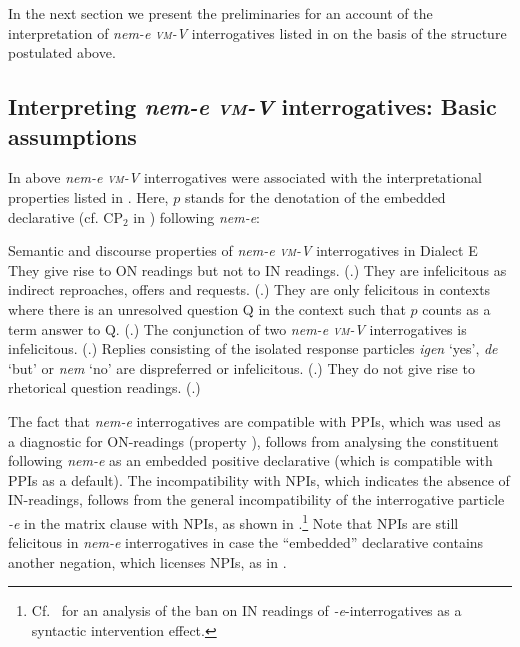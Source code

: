 \documentclass[output=paper,colorlinks,citecolor=brown]{langscibook}
\begin{document}
	In the next section we present the preliminaries for an account of the interpretation of  \textit{nem-e \textsc{vm}-V} interrogatives listed in  on the basis of the structure postulated above.
	
	
	
\subsection{Interpreting  \textit{nem-e \textsc{vm}-V} interrogatives: Basic assumptions}\label{sect:basic}
\largerpage
	In   above \textit{nem-e \textsc{vm}-V} interrogatives were  associated with  the interpretational  properties listed in .  Here, $p$ stands for the denotation of the embedded declarative (cf. CP$_2$ in ) following \textit{nem-e}:

	
	\ea\label{properties} Semantic and discourse properties of \textit{nem-e \textsc{vm}-V} interrogatives in Dialect E
	\ea\label{property1} They give rise to ON readings but not to IN readings. (.)
	\ex\label{property5} They are infelicitous as indirect reproaches, offers and requests. (.)
	\ex\label{property2} They are only felicitous in contexts where there is an unresolved question Q in the context such that $p$ counts as a term answer to Q. (.)
	\ex\label{property3} The conjunction of two \textit{nem-e \textsc{vm}-V}  interrogatives is infelicitous. (.) 
	\ex\label{property6} Replies consisting of the isolated response particles \textit{igen} `yes', \textit{de} `but' or \textit{nem} `no' are dispreferred or infelicitous. (.)
	\ex\label{property4} They do not give rise to rhetorical question readings. (.) 
	\z
	\z
	
	\noindent The fact that \textit{nem-e} interrogatives are compatible with PPIs, which was used as a diagnostic for ON-readings (property ), follows from analysing the constituent following \textit{nem-e}  as an embedded  positive declarative (which is compatible with PPIs as a default). The incompatibility with NPIs,  which indicates the absence of IN-readings, follows from the general incompatibility of the  interrogative particle \textit{-e}  in the matrix clause with NPIs, as shown in .\footnote{Cf.~\citet{gaertner+gyuris2022} for an analysis of the ban on IN readings of \textit{-e}-interrogatives as a syntactic intervention effect.}
	Note that NPIs are still felicitous in \textit{nem-e} interrogatives in case the ``embedded'' declarative contains another negation, which licenses NPIs, as in .
	
\end{document}
